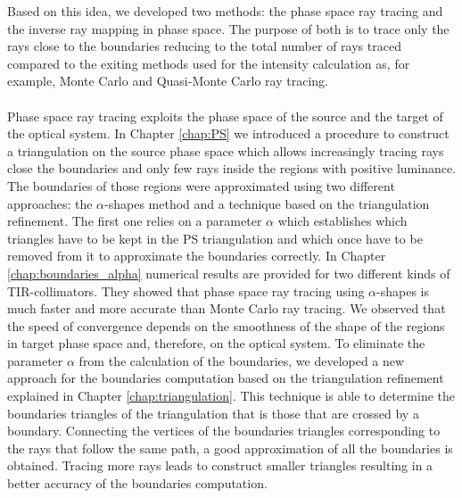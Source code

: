 Based on this idea, we developed two methods: the phase space ray tracing and the inverse ray mapping in phase space. The purpose of both is to trace only the rays close to the boundaries reducing to the total number of rays traced compared to the exiting methods used for the intensity calculation as, for example, Monte Carlo and Quasi-Monte Carlo ray tracing.
\\ \\ \indent Phase space ray tracing exploits the phase space of the source and the target of the optical system. In Chapter \ref{chap:PS} we introduced a procedure to construct a triangulation on the source phase space which allows increasingly tracing rays close the boundaries and only few rays inside the regions with positive luminance. 
The boundaries of those regions were approximated using two different approaches: the $\alpha$-shapes method and a technique based on the triangulation refinement. The first one relies on a parameter $\alpha$ which establishes which triangles have to be kept in the PS triangulation and which once have to be removed from it to approximate the boundaries correctly. 
In Chapter \ref{chap:boundaries_alpha} numerical results are provided for two different kinds of TIR-collimators. They showed that phase space ray tracing using $\alpha$-shapes is much faster and more accurate than Monte Carlo ray tracing. We observed that the speed of convergence depends on the smoothness of the shape of the regions in target phase space and, therefore, on the optical system. To eliminate the parameter $\alpha$ from the calculation of the boundaries, we developed a new approach for the boundaries computation based on the triangulation refinement explained in Chapter \ref{chap:triangulation}. This technique is able to determine the boundaries triangles of the triangulation that is those that are crossed by a boundary. Connecting the vertices of the boundaries triangles corresponding to the rays that follow the same path, a good approximation of all the boundaries is obtained. Tracing more rays leads to construct smaller triangles resulting in a better accuracy of the boundaries computation. 
